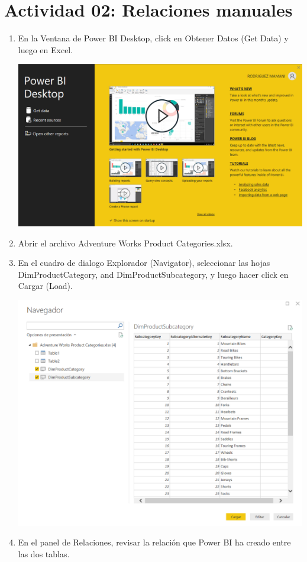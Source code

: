 \section{Actividad 02: Relaciones manuales} 

\begin{enumerate}[1.]

    \item En la Ventana de Power BI Desktop, click en Obtener Datos (Get Data) y luego en Excel.

	\begin{center}
	\includegraphics[width=13cm]{./Imagenes/imagen1}
	\end{center}

    \item Abrir el archivo Adventure Works Product Categories.xlsx.

    \item En el cuadro de dialogo Explorador (Navigator), seleccionar las hojas DimProductCategory, and DimProductSubcategory, y luego hacer click en Cargar (Load).

	\begin{center}
	\includegraphics[width=13cm]{./Imagenes/power6}
	\end{center}
\pagebreak
    \item  En el panel de Relaciones, revisar la relación que Power BI ha creado entre las dos tablas.


\end{enumerate}
